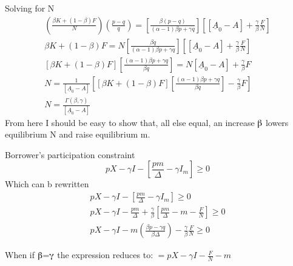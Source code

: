\documentclass{article} %
\begin{document}
\noindent Solving for N
\[\begin{array}{l} {\left(\frac{\beta K+(1-\beta )F}{N} \right)\left(\frac{p-q}{q} \right)=\left[\frac{\beta (p-q)}{(\alpha -1)\beta p+\gamma q} \right]\left[\left[\underline{A}_{0} -A\right]+\frac{\gamma }{\beta } \frac{F}{N} \right]} \\ {\beta K+(1-\beta )F=N\left[\frac{\beta q}{(\alpha -1)\beta p+\gamma q} \right]\left[\left[\underline{A}_{0} -A\right]+\frac{\gamma }{\beta } \frac{F}{N} \right]} \\ {\left[\beta K+(1-\beta )F\right]\left[\frac{(\alpha -1)\beta p+\gamma q}{\beta q} \right]=N\left[\underline{A}_{0} -A\right]+\frac{\gamma }{\beta } F} \\ {N=\frac{1}{\left[\underline{A}_{0} -A\right]} \left[\left[\beta K+(1-\beta )F\right]\left[\frac{(\alpha -1)\beta p+\gamma q}{\beta q} \right]-\frac{\gamma }{\beta } F\right]} \\ {\boxed{N=\frac{\Gamma (\beta ,\gamma )}{\left[\underline{A}_{0} -A\right]} } } \end{array}\] 
From here I should be easy to show that, all else equal, an increase $\mathrm{\betaup }$ lowers equilibrium N and raise equilibrium m.   

\noindent 

\noindent Borrower's participation constraint
\[pX-\gamma I-\left[\frac{pm}{\Delta } -\gamma I_{m} \right]\ge 0\] 
Which can b rewritten
\[\begin{array}{l} {pX-\gamma I-\left[\frac{pm}{\Delta } -\gamma I_{m} \right]\ge 0} \\ {pX-\gamma I-\frac{pm}{\Delta } +\frac{\gamma }{\beta } \left[\frac{pm}{\Delta } -m-\frac{F}{N} \right]\ge 0} \\ {pX-\gamma I-m\left(\frac{\beta p-\gamma q}{\beta \Delta } \right)-\frac{\gamma }{\beta } \frac{F}{N} \ge 0} \end{array}\] 


\noindent When if $\mathrm{\betaup }$=$\mathrm{\gammaup }$ the expression reduces to: $=pX-\gamma I-\frac{F}{N} -m$

\noindent 

\noindent 

\noindent 



\noindent 
\section{}

\noindent 
\section{\eject }
\end{document}
